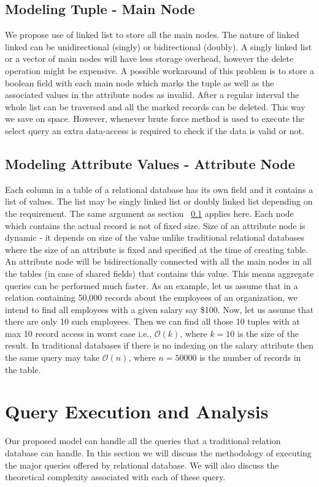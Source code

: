 \documentclass[12pt, oneside]{book}
\begin{document}
\subsection{Modeling Tuple - Main Node}
\label{sec:tuple}
We propose use of linked list to store all the main nodes. The nature of linked linked can be unidirectional (singly) or bidirectional (doubly). A singly linked list or a vector of main nodes will have less storage overhead, however the delete operation might be expensive. A possible workaround of this problem is to store a boolean field with each main node which marks the tuple as well as the associated values in the attribute nodes as invalid. After a regular interval the whole list can be traversed and all the marked records can be deleted. This way we save on space. However, whenever brute force method is used to execute the select query an extra data-access is required to check if the data is valid or not.
\subsection{Modeling Attribute Values - Attribute Node}
Each column in a table of a relational database has its own field and it contains a list of values. The list may be singly linked list or doubly linked list depending on the requirement. The same argument as section ~\ref{sec:tuple} applies here. Each node which contains the actual record is not of fixed size. Size of an attribute node is dynamic - it depends on size of the value unlike traditional relational databases where the size of an attribute is fixed and specified at the time of creating table. An attribute node will be bidirectionally connected with all the main nodes in all the tables (in case of shared fields) that contains this value. This means aggregate queries can be performed much faster. As an example, let us assume that in a relation containing 50,000 records about the employees of an organization, we intend to find all employees with a given salary say \$100. Now, let us assume that there are only 10 such employees. Then we can find all those 10 tuples with at max 10 record access in worst case i.e., $\mathcal{O}(k)$, where $k = 10$ is the size of the result. In traditional databases if there is no indexing on the salary attribute then the same query may take $\mathcal{O}(n)$, where $n = 50000$ is the number of records in the table.

\section{Query Execution and Analysis}
\label{sec:QEandA}
Our proposed model can handle all the queries that a traditional relation database can handle. In this section we will discuss the methodology of executing the major queries offered by relational database. We will also discuss the theoretical complexity associated with each of these query.
\end{document}
